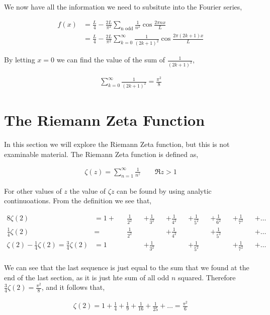 \documentclass[11pt]{amsart}
\begin{document}
We now have all the information we need to subsitute into the Fourier series,

\begin{align*}
  f(x) &= \frac{L}{4}-\frac{2L}{\pi^2}\sum\limits_{\text{n odd}}\frac{1}{n^2}\cos{\frac{2\pi nx}{L}} \\
       &= \frac{L}{4}-\frac{2L}{\pi^2}\sum\limits_{k=0}^{\infty}\frac{1}{{(2k+1)}^2}\cos{\frac{2\pi(2k+1)x}{L}}
\end{align*}

By letting $x = 0$ we can find the value of the sum of $\frac{1}{{(2k+1)}^2}$,

\begin{align*}
  \sum\limits_{k=0}^{\infty} \frac{1}{{(2k+1)}^2} = \frac{\pi^2}{8}
\end{align*}

\section{The Riemann Zeta Function}

In this section we will explore the Riemann Zeta function, but this is not examinable material. The Riemann Zeta function is defined as,

\begin{align*}
  \zeta(z) = \sum\limits_{n=1}^{\infty} \frac{1}{n^z} \qquad \Re{z} > 1
\end{align*}

For other values of $z$ the value of $\zeta{z}$ can be found by using analytic continuoations. From the definition we see that,

\begin{alignat*}{8}
  \zeta(2) &= 1 + &&\frac{1}{2^2} &&+ \frac{1}{3^2} &&+ \frac{1}{4^2} &&+ \frac{1}{5^2} &&+ \frac{1}{6^2} &&+ \frac{1}{7^2} &&+ \dots \\
  \frac{1}{4}\zeta(2) &= &&\frac{1}{2^2} && &&+ \frac{1}{4^2} && &&+ \frac{1}{5^2} && &&+ \dots \\
  \zeta(2) - \frac{1}{4}\zeta(2) = \frac{3}{4}\zeta(2) &= 1 && &&+ \frac{1}{3^2} && &&+ \frac{1}{5^2} && &&+ \frac{1}{7^2} &&+ \dots \\
\end{alignat*}

We can see that the last sequence is just equal to the sum that we found at the end of the last section, as it is just hte sum of all odd $n$ squared. Therefore $\frac{3}{4}\zeta(2) = \frac{\pi^2}{8}$, and it follows that,

\begin{align*}
  \zeta(2) = 1 + \frac{1}{4} + \frac{1}{9} + \frac{1}{16} + \frac{1}{25} + \dots = \frac{\pi^2}{6}
\end{align*}
\end{document}
